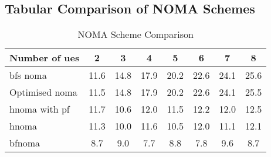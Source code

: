 \begin{appendices}

\chapter{Tabular Comparison of NOMA Schemes}

\begin{table}[htb!]
	\centering
	\caption{NOMA Scheme Comparison}
	\begin{tabular}{l | S S S S S S S}
		Number of \acp{ue} & 2 & 3 & 4 & 5 & 6 & 7 & 8 \\
		\hline
		\ac{bfs} \ac{noma} & 11.6 & 14.8 & 17.9 & 20.2 & 22.6 & 24.1 & 25.6 \\
		Optimised \ac{noma} & 11.5 & 14.8 & 17.9 & 20.2 & 22.6 & 24.1 & 25.5 \\
		\ac{hnoma} with \ac{pf} & 11.7 & 10.6 & 12.0 & 11.5 & 12.2 & 12.0 & 12.5 \\
		\ac{hnoma} & 11.3 & 10.0 & 11.6 & 10.5 & 12.0 & 11.1 & 12.1 \\
		\ac{bfnoma} &  8.7 &  9.0 &  7.7 &  8.8 &  7.8 &  9.6 &  8.7 \\
	\end{tabular}
	\label{tab:nsc}
\end{table}

\end{appendices}

